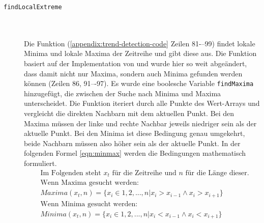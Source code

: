\begin{description}
\item[\texttt{findLocalExtreme}]\hfill \\\\
Die Funktion (\ref{appendix:trend-detection-code} Zeilen 81-–99) findet lokale Minima und lokale Maxima der Zeitreihe und gibt diese aus. Die Funktion basiert auf der Implementation von \cite{SamuelProll.2022} und wurde hier so weit abgeändert, dass damit nicht nur Maxima, sondern auch Minima gefunden werden können (Zeilen 86, 91–-97). Es wurde eine boolesche Variable \texttt{findMaxima} hinzugefügt, die zwischen der Suche nach Minima und Maxima unterscheidet. Die Funktion iteriert durch alle Punkte des Wert-Arrays und vergleicht die direkten Nachbarn mit dem aktuellen Punkt. Bei den Maxima müssen der linke und rechte Nachbar jeweils niedriger sein als der aktuelle Punkt. Bei den Minima ist diese Bedingung genau umgekehrt, beide Nachbarn müssen also höher sein als der aktuelle Punkt. In der folgenden Formel \ref{eqn:minmax} werden die Bedingungen mathematisch formuliert.
\begin{equation}
\label{eqn:minmax}
    \begin{split}
        &\text{Im Folgenden steht }x_t\text{ für die Zeitreihe und }n\text{ für die Länge dieser.}\\
       & \text{Wenn Maxima gesucht werden:}\\&
        	Maxima(x_t, n)=\{ x_i \in {1, 2, ..., n}| x_i > x_{i-1} \wedge x_i > x_{i+1}\}\\
         & \text{Wenn Minima gesucht werden:}\\&
        	Minima(x_t, n)=\{ x_i \in {1, 2, ..., n}| x_i < x_{i-1} \wedge x_i < x_{i+1}\}\\
    \end{split}
\end{equation}
\end{description}

